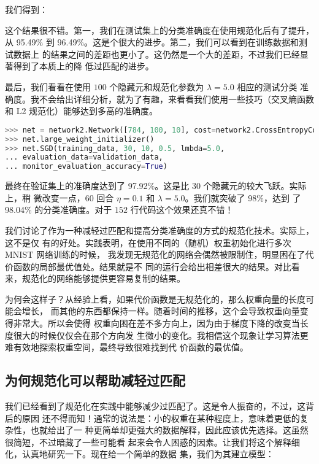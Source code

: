我们得到：

这个结果很不错。第一，我们在测试集上的分类准确度在使用规范化后有了提升，
从 95.49\% 到 96.49\%。这是个很大的进步。第二，我们可以看到在训练数据和测试数据上
的结果之间的差距也更小了。这仍然是一个大的差距，不过我们已经显著得到了本质上的降
低过匹配的进步。

最后，我们看看在使用 $100$ 个隐藏元和规范化参数为 $\lambda = 5.0$ 相应的测试分类
准确度。我不会给出详细分析，就为了有趣，来看看我们使用一些技巧（交叉熵函数和 L2
规范化）能够达到多高的准确度。

\begin{lstlisting}[language=Python]
>>> net = network2.Network([784, 100, 10], cost=network2.CrossEntropyCost)
>>> net.large_weight_initializer()
>>> net.SGD(training_data, 30, 10, 0.5, lmbda=5.0,
... evaluation_data=validation_data,
... monitor_evaluation_accuracy=True)
\end{lstlisting}

最终在验证集上的准确度达到了 97.92\%。这是比 $30$ 个隐藏元的较大飞跃。实际上，稍
微改变一点，$60$ 回合 $\eta=0.1$ 和 $\lambda = 5.0$。我们就突破了 98\%，达到
了 98.04\% 的分类准确度。对于 $152$ 行代码这个效果还真不错！

我们讨论了作为一种减轻过匹配和提高分类准确度的方式的规范化技术。实际上，这不是仅
有的好处。实践表明，在使用不同的（随机）权重初始化进行多次 MNIST 网络训练的时候，
我发现无规范化的网络会偶然被限制住，明显困在了代价函数的局部最优值处。结果就是不
同的运行会给出相差很大的结果。对比看来，规范化的网络能够提供更容易复制的结果。

为何会这样子？从经验上看，如果代价函数是无规范化的，那么权重向量的长度可能会增长，
而其他的东西都保持一样。随着时间的推移，这个会导致权重向量变得非常大。所以会使得
权重向困在差不多方向上，因为由于梯度下降的改变当长度很大的时候仅仅会在那个方向发
生微小的变化。我相信这个现象让学习算法更难有效地探索权重空间，最终导致很难找到代
价函数的最优值。

\subsection{为何规范化可以帮助减轻过匹配}

我们已经看到了规范化在实践中能够减少过匹配了。这是令人振奋的，不过，这背后的原因
还不得而知！通常的说法是：小的权重在某种程度上，意味着更低的复杂性，也就给出了一
种更简单却更强大的数据解释，因此应该优先选择。这虽然很简短，不过暗藏了一些可能看
起来会令人困惑的因素。让我们将这个解释细化，认真地研究一下。现在给一个简单的数据
集，我们为其建立模型：

